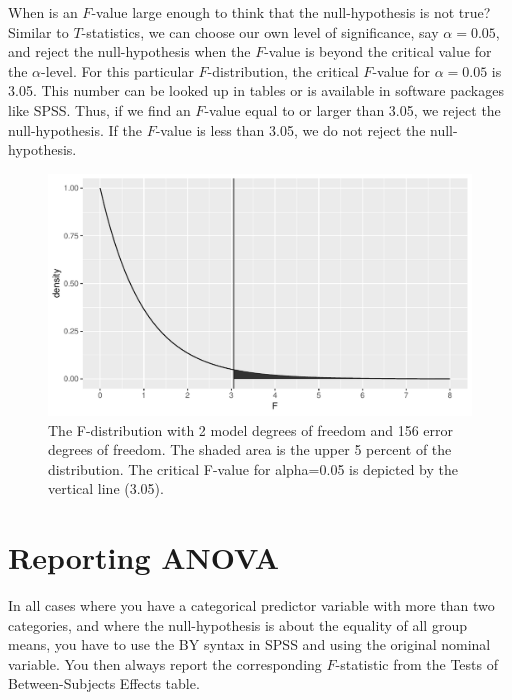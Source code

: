 \documentclass[]{book}\usepackage[]{graphicx}\usepackage[]{color}
\makeatletter
\def\maxwidth{ %
  \ifdim\Gin@nat@width>\linewidth
    \linewidth
  \else
    \Gin@nat@width
  \fi
}
\newenvironment{knitrout}{}{} %
\makeatother
\begin{document}
When is an $F$-value large enough to think that the null-hypothesis is not true? Similar to $T$-statistics, we can choose our own level of significance, say $\alpha=0.05$, and reject the null-hypothesis when the $F$-value is beyond the critical value for the $\alpha$-level. For this particular $F$-distribution, the critical $F$-value for $\alpha=0.05$ is 3.05. This number can be looked up in tables or is available in software packages like SPSS. Thus, if we find an $F$-value equal to or larger than 3.05, we reject the null-hypothesis. If the $F$-value is less than 3.05, we do not reject the null-hypothesis. 

\begin{knitrout}
\color{fgcolor}\begin{figure}

{\centering \includegraphics[width=\maxwidth]{figure/dummy_23-1} 

}

\caption[The F-distribution with 2 model degrees of freedom and 156 error degrees of freedom]{The F-distribution with 2 model degrees of freedom and 156 error degrees of freedom. The shaded area is the upper 5 percent of the distribution. The critical F-value for alpha=0.05 is depicted by the vertical line (3.05).}\label{fig:dummy_23}
\end{figure}


\end{knitrout}




\section{Reporting ANOVA}
In all cases where you have a categorical predictor variable with more than two categories, and where the null-hypothesis is about the equality of all group means, you have to use the BY syntax in SPSS and using the original nominal variable. You then always report the corresponding $F$-statistic from the Tests of Between-Subjects Effects table. 
\end{document}
